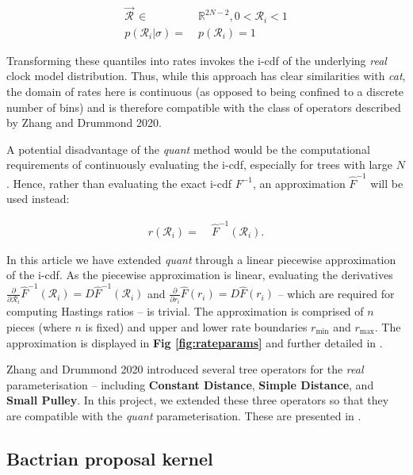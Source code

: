 \documentclass[10pt,letterpaper]{article}
\begin{document}
\begin{align}
\vec{\mathcal{R}}^{\,} \in & \; \mathbb{R}^{2N-2}, 0 < \mathcal{R}_i < 1  \\
p(\mathcal{R}_i | \sigma) = & \; p(\mathcal{R}_i) = 1
\end{align}


Transforming these quantiles into rates invokes the i-cdf of the underlying \textit{real} clock model distribution. Thus, while this approach has clear similarities with \textit{cat}, the domain of rates here is continuous (as opposed to being confined to a discrete number of bins) and is therefore compatible with the class of operators described by Zhang and Drummond 2020. 

A potential disadvantage of the \textit{quant} method would be the computational requirements of continuously evaluating the i-cdf, especially for trees with large $N$. Hence, rather than evaluating the exact i-cdf $F^{-1}$, an approximation $\hat{F}^{-1}$ will be used instead:


\begin{align}
r(\mathcal{R}_i) =& \; \hat{F}^{-1}(\mathcal{R}_i).
\end{align}


In this article we have extended \textit{quant} through a linear piecewise approximation of the i-cdf. As the piecewise approximation is linear, evaluating the derivatives $\frac{\partial}{\partial \mathcal{R}_i} \hat{F}^{-1}(\mathcal{R}_i) =  D \hat{F}^{-1}(\mathcal{R}_i)$ and $\frac{\partial}{\partial r_i} \hat{F}(r_i) = D \hat{F}(r_i)$  -- which are required for computing Hastings ratios -- is trivial. The approximation is comprised of $n$ pieces (where $n$ is fixed) and upper and lower rate boundaries $r_\text{min}$ and $r_\text{max}$. The approximation is displayed in \textbf{Fig \ref{fig:rateparams}} and further detailed in \textbf{}.


Zhang and Drummond 2020 introduced several tree operators for the \textit{real} parameterisation -- including \textbf{Constant Distance}, \textbf{Simple Distance}, and \textbf{Small Pulley}. In this project, we extended these three operators so that they are compatible with the \textit{quant} parameterisation. These are presented in \textbf{}. 



\subsection*{Bactrian proposal kernel} \label{sect:randomwalks}
\end{document}
